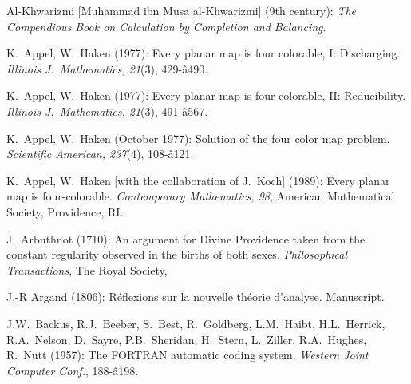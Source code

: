 
\begin{thebibliography}{999}
 


Al-Khwarizmi [Muhammad ibn Musa al-Khwarizmi] (9th century):
{\it The Compendious Book on Calculation by Completion and Balancing}.



K.~Appel, W.~Haken (1977):
Every planar map is four colorable, I: Discharging.
{\it Illinois J.~Mathematics, 21}(3), 429-â490.

K.~Appel, W.~Haken (1977):
Every planar map is four colorable, II: Reducibility.
{\it Illinois J.~Mathematics, 21}(3), 491-â567.

K.~Appel, W.~Haken (October 1977):
Solution of the four color map problem.
{\it Scientific American, 237}(4), 108-â121.

K.~Appel, W.~Haken [with the collaboration of J.~Koch] (1989):
Every planar map is four-colorable.
{\it Contemporary Mathematics, 98},
American Mathematical Society, Providence, RI.

J.~Arbuthnot (1710): 
An argument for Divine Providence taken from the constant regularity observed in the births of both sexes.
{\it Philosophical Transactions}, The Royal Society,

J.-R Argand (1806):
R\'{e}flexions sur la nouvelle th\'{e}orie d'analyse.  Manuscript.


J.W.~Backus, R.J.~Beeber, S.~Best, R.~Goldberg, L.M.~Haibt,
H.L.~Herrick, R.A.~Nelson, D.~Sayre, P.B.~Sheridan, H.~Stern,
L.~Ziller, R.A.~Hughes, R.~Nutt (1957):
The FORTRAN automatic coding system.  {\it Western Joint Computer
Conf.}, 188-â198.


\end{thebibliography}
